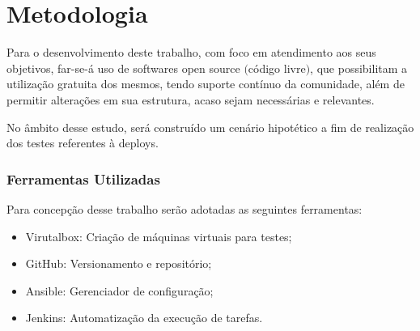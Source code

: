 



\chapter{Metodologia}\label{cap:metodologia}


Para o desenvolvimento deste trabalho, com foco em atendimento aos seus objetivos, far-se-á uso de softwares open source  $($código livre$)$, que possibilitam a utilização gratuita dos mesmos, tendo suporte contínuo da comunidade, além de permitir alterações em sua estrutura, acaso sejam necessárias e relevantes.

No âmbito desse estudo, será construído um cenário hipotético a fim de realização dos testes referentes à deploys.



\subsection{Ferramentas Utilizadas}
Para concepção desse trabalho serão adotadas as seguintes ferramentas:

\begin{itemize}
	
\item Virutalbox: Criação de máquinas virtuais para testes;

\item GitHub: Versionamento e repositório;

\item Ansible: Gerenciador de configuração;

\item Jenkins: Automatização da execução de tarefas.

\end{itemize}











